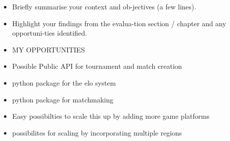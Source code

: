 \begin{itemize}
	\item Briefly summarise your context and ob-jectives (a few lines).
	\item Highlight your findings from the evalua-tion section / chapter and any opportuni-ties identified.
	
	\item MY OPPORTUNITIES
	\item Possible Public API for tournament and match creation
	\item python package for the elo system
	\item python package for matchmaking
	\item Easy possibilties to scale this up by adding more game platforms
	\item possibilites for scaling by incorporating multiple regions
	
\end{itemize}

